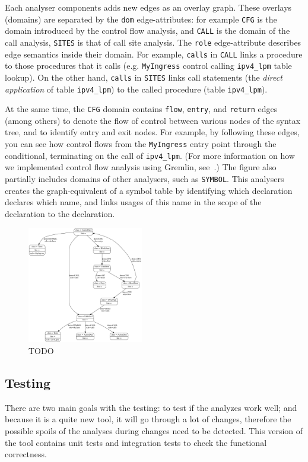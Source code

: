 \documentclass[sigconf]{acmart}
\begin{document}
  Each analyser components adds new edges as an overlay graph. These overlays (domains) are separated by the \texttt{dom} edge-attributes: for example \texttt{CFG} is the domain introduced by the control flow analysis, and \texttt{CALL} is the domain of the call analysis, \texttt{SITES} is that of call site analysis. The \texttt{role} edge-attribute describes edge semantics inside their domain. For example, \texttt{calls} in \texttt{CALL} links a procedure to those procedures that it calls (e.g. \texttt{MyIngress} control calling \texttt{ipv4\_lpm} table lookup). On the other hand, \texttt{calls} in \texttt{SITES} links call statements (the \textit{direct application} of table \texttt{ipv4\_lpm}) to the called procedure (table \texttt{ipv4\_lpm}). 
  
  At the same time, the \texttt{CFG} domain contains \texttt{flow}, \texttt{entry}, and \texttt{return} edges (among others) to denote the flow of control between various nodes of the syntax tree, and to identify entry and exit nodes. For example, by following these edges, you can see how control flows from the \texttt{MyIngress} entry point through the conditional, terminating on the call of \texttt{ipv4\_lpm}. (For more information on how we implemented control flow analysis using Gremlin, see~\cite{macs20}.) The figure also partially includes domains of other analysers, such as \texttt{SYMBOL}. This analysers creates the graph-equivalent of a symbol table by identifying which declaration declares which name, and links usages of this name in the scope of the declaration to the declaration.

  \begin{figure}
    \includegraphics[width=0.45\textwidth]{figures/output.pdf}
    \caption{TODO}\label{fig:output}
  \end{figure}

	\subsection{Testing} %
	There are two main goals with the testing: to test if the analyzes work well; and because it is a quite new tool, it will go through a lot of changes, therefore the possible spoils of the analyses during changes need to be detected. This version of the tool contains unit tests and integration tests to check the functional correctness. 
	
\end{document}
